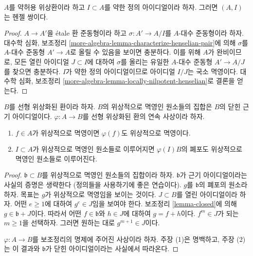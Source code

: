 \begin{lemma}
\label{lemma-weakly-admissible-henselian}
$A$를 약허용 위상환이라 하고 $I \subset A$를 약한 정의
아이디얼이라 하자. 그러면 $(A, I)$는 헨젤 쌍이다.
\end{lemma}

\begin{proof}
$A \to A'$을 \'etale 환 준동형이라 하고
$\sigma : A' \to A/I$를 $A$-대수 준동형이라 하자.
대수학 심화, 보조정리
\ref{more-algebra-lemma-characterize-henselian-pair}에 의해
$\sigma$를 $A$-대수 준동형 $A' \to A$로 올릴 수 있음을 보이면
충분하다. 이를 위해 $A$가 완비이므로, 모든 열린 아이디얼
$J \subset I$에 대하여 $\sigma$를 올리는 유일한 $A$-대수 준동형
$A' \to A/J$를 찾으면 충분하다. $I$가 약한 정의 아이디얼이므로
아이디얼 $I/J$는 국소 멱영이다. 대수학 심화, 보조정리
\ref{more-algebra-lemma-locally-nilpotent-henselian}로 결론을 얻는다.
\end{proof}

\begin{lemma}
\label{lemma-topologically-nilpotent}
$B$를 선형 위상화된 환이라 하자. $B$의 위상적으로 멱영인 원소들의
집합은 $B$의 닫힌 근기 아이디얼이다. $\varphi : A \to B$를
선형 위상화된 환의 연속 사상이라 하자.
\begin{enumerate}
\item $f \in A$가 위상적으로 멱영이면 $\varphi(f)$도 위상적으로
멱영이다.
\item $I \subset A$가 위상적으로 멱영인 원소들로 이루어지면
$\varphi(I)B$의 폐포도 위상적으로 멱영인 원소들로 이루어진다.
\end{enumerate}
\end{lemma}

\begin{proof}
$\mathfrak b \subset B$를 위상적으로 멱영인 원소들의 집합이라 하자.
$\mathfrak b$가 근기 아이디얼이라는 사실의 증명은 생략한다
(정의들을 사용하기에 좋은 연습이다). $g$를 $\mathfrak b$의 폐포의
원소라 하자. 목표는 $g$가 위상적으로 멱영임을 보이는 것이다.
$J \subset B$를 열린 아이디얼이라 하자. 어떤 $e \geq 1$에 대하여
$g^e \in J$임을 보여야 한다. 보조정리 \ref{lemma-closed}에 의해
$g \in \mathfrak b + J$이다. 따라서 어떤 $f \in \mathfrak b$와
$h \in J$에 대하여 $g = f + h$이다. $f^m \in J$가 되는
$m \geq 1$을 선택하자. 그러면 원하는 대로 $g^{m + 1} \in J$이다.

\medskip\noindent
$\varphi : A \to B$를 보조정리의 명제에 주어진 사상이라 하자.
주장 (1)은 명백하고, 주장 (2)는 이 결과와 $\mathfrak b$가 닫힌
아이디얼이라는 사실에서 따라온다.
\end{proof}

